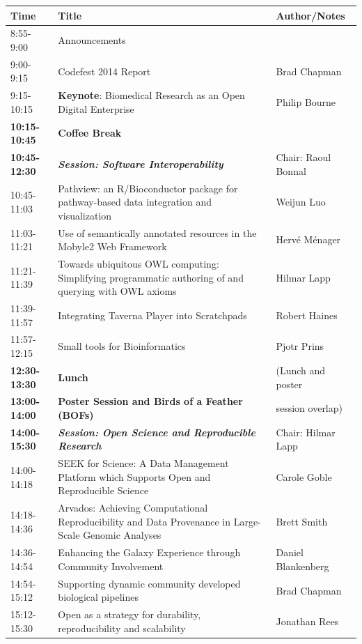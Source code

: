 \documentclass[10pt,oneside]{article}
\begin{document}
\begin{center}
\begin{tabular}{|p{2.0cm}|p{9.95cm}|p{3.25cm}|}
\hline
Time & Title & Author/Notes \\
\hline
8:55-9:00 & Announcements & \\
9:00-9:15 & Codefest 2014 Report & Brad Chapman\\
9:15-10:15 & \textbf{Keynote}: Biomedical Research as an Open Digital Enterprise & Philip Bourne\\
\hline
\textbf{10:15-10:45} & \textbf{Coffee Break} & \\
\hline
\textbf{10:45-12:30} & \textbf{\textit{Session: Software Interoperability}} & Chair: Raoul Bonnal\\
10:45-11:03 & Pathview: an R/Bioconductor package for pathway-based data integration and visualization & Weijun Luo\\
11:03-11:21 & Use of semantically annotated resources in the Mobyle2 Web Framework & Herv{\'e} M{\'e}nager\\
11:21-11:39 & Towards ubiquitous OWL computing: Simplifying programmatic authoring of and querying with OWL axioms & Hilmar Lapp\\
11:39-11:57 & Integrating Taverna Player into Scratchpads & Robert Haines\\
11:57-12:15 & Small tools for Bioinformatics & Pjotr Prins\\
\hline
\textbf{12:30-13:30} & \textbf{Lunch} & (Lunch and poster\\
\textbf{13:00-14:00} & \textbf{Poster Session and Birds of a Feather (BOFs)} & session overlap)\\
\hline
\textbf{14:00-15:30} & \textbf{\textit{Session: Open Science and Reproducible Research}} & Chair: Hilmar Lapp\\
14:00-14:18 & SEEK for Science: A Data Management Platform which Supports Open and Reproducible Science & Carole Goble\\
14:18-14:36 & Arvados: Achieving Computational Reproducibility and Data Provenance in Large-Scale Genomic Analyses & Brett Smith\\
14:36-14:54 & Enhancing the Galaxy Experience through Community Involvement & Daniel Blankenberg\\
14:54-15:12 & Supporting dynamic community developed biological pipelines & Brad Chapman\\
15:12-15:30 & Open as a strategy for durability, reproducibility and scalability & Jonathan Rees\\

\end{tabular}
\end{center}
\end{document}

